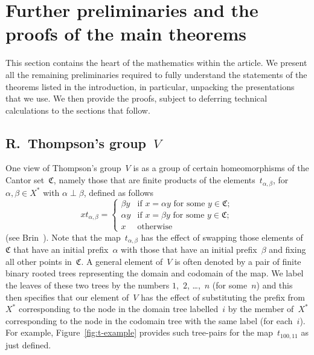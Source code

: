 \documentclass[a4paper,11pt]{article}
\numberwithin{equation}{section}
\newcommand{\C}{\mathfrak{C}}
\begin{document}
\section{Further preliminaries and the proofs of the main theorems}
\label{sec:prelims}

This section contains the heart of the mathematics within the article.
We present all the remaining preliminaries required to fully
understand the statements of the theorems listed in the introduction,
in particular, unpacking the presentations that we use.  We then
provide the proofs, subject to deferring technical calculations to the
sections that follow.

\subsection{\boldmath R.~Thompson's group~$V$}

One view of Thompson's group~$V$ is as a group of certain
homeomorphisms of the Cantor set~$\C$, namely those that are finite
products of the elements~$t_{\alpha,\beta}$, for $\alpha,\beta \in
X^{\ast}$ with $\alpha \perp \beta$, defined as follows
\begin{equation}
  x t_{\alpha,\beta} = \begin{cases}
    \beta y &\text{if $x = \alpha y$ for some $y \in \C$}; \\
    \alpha y &\text{if $x = \beta y$ for some $y \in \C$}; \\
    x &\text{otherwise}
  \end{cases}
  \label{eq:swapmap}
\end{equation}
(see Brin~\cite[Lemma~12.2]{Brin-higher}).  Note that the
map~$t_{\alpha,\beta}$ has the effect of swapping those elements
of~$\C$ that have an initial prefix~$\alpha$ with those that have an
initial prefix~$\beta$ and fixing all other points in~$\C$.  A general
element of~$V$ is often denoted by a pair of finite binary rooted
trees representing the domain and codomain of the map.  We label the
leaves of these two trees by the numbers $1$,~$2$, \dots,~$n$ (for
some~$n$) and this then specifies that our element of~$V$ has the
effect of substituting the prefix from~$X^{\ast}$ corresponding to the
node in the domain tree labelled~$i$ by the member of~$X^{\ast}$
corresponding to the node in the codomain tree with the same label
(for each~$i$).  For example, Figure~\ref{fig:t-example} provides such
tree-pairs for the map~$t_{100,11}$ as just defined.
\end{document}
